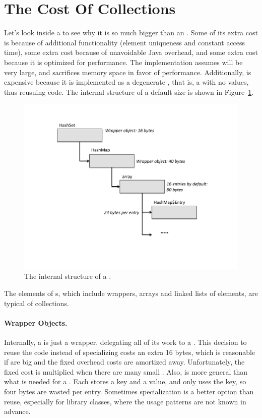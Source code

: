 \section{The Cost Of Collections}
\label{sec:collectioncost}
Let's look inside a  to see why it is so much bigger than an
. Some of its extra cost is because of additional functionality
(element uniqueness and constant access time), some extra cost because of
unavoidable Java overhead, and some extra cost because it is optimized for
performance. The  
implementation assumes  will be very large, and sacrifices memory 
space in favor of performance. Additionally,  is expensive
because it is implemented as a degenerate , that is, a
 with no values, thus reusuing  code. The internal
structure of a default size  is shown in
Figure~\ref{fig:hashset_new}.
 \begin{figure}
  \centering
 \includegraphics[width=.80\textwidth]{part1/Figures/collections/hashset_new.pdf}
  \caption{The internal structure of a .}
  \label{fig:hashset_new}
\end{figure}

The elements of s, which include wrappers, arrays and linked
lists of elements, are typical of collections. 

\paragraph{Wrapper Objects.}
Internally, a  is just a wrapper, delegating all of its work to a .
This decision to reuse the  code instead of specializing
 costs an extra 16 bytes, which is reasonable if
 are big and the fixed overhead costs are amortized away. 
Unfortunately, the fixed cost is multiplied when there are many
small . 
Also,  is more general than what is needed for a .
Each  stores a key and a
value, and  only uses the key, so four bytes are wasted per
entry. Sometimes specialization is a better option than reuse, especially for
library classes, where the usage patterns are not known in advance.
 
